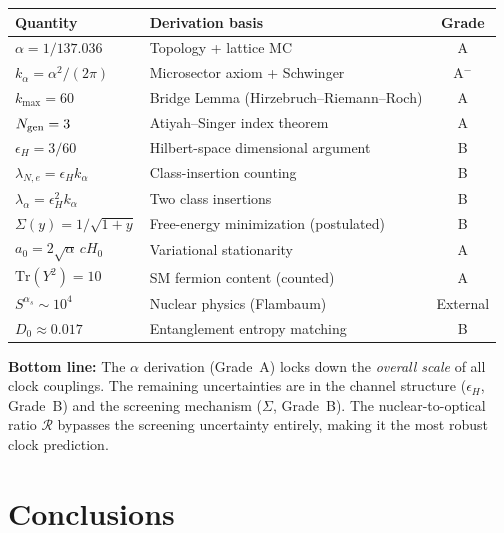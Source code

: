 \documentclass[11pt]{article}
\newcommand{\kalpha}{k_\alpha}
\theoremstyle{definition}
\theoremstyle{remark}
\begin{document}
\begin{center}
\renewcommand{\arraystretch}{1.3}
\begin{tabular}{llc}
\toprule
Quantity & Derivation basis & Grade \\
\midrule
$\alpha = 1/137.036$ & Topology + lattice MC & A \\
$\kalpha = \alpha^2/(2\pi)$ & Microsector axiom + Schwinger & A$^-$ \\
$k_{\max} = 60$ & Bridge Lemma (Hirzebruch--Riemann--Roch) & A \\
$N_{\rm gen} = 3$ & Atiyah--Singer index theorem & A \\
$\epsilon_H = 3/60$ & Hilbert-space dimensional argument & B \\
$\lambda_{N,e} = \epsilon_H \kalpha$ & Class-insertion counting & B \\
$\lambda_\alpha = \epsilon_H^2 \kalpha$ & Two class insertions & B \\
$\Sigma(y) = 1/\sqrt{1+y}$ & Free-energy minimization (postulated) & B \\
$a_0 = 2\sqrt{\alpha}\,cH_0$ & Variational stationarity & A \\
$\mathrm{Tr}(Y^2) = 10$ & SM fermion content (counted) & A \\
$S^{\alpha_s} \sim 10^4$ & Nuclear physics (Flambaum) & External \\
$D_0 \approx 0.017$ & Entanglement entropy matching & B \\
\bottomrule
\end{tabular}
\end{center}

\textbf{Bottom line:} The $\alpha$ derivation (Grade~A) locks down the
\emph{overall scale} of all clock couplings. The remaining uncertainties
are in the channel structure ($\epsilon_H$, Grade~B) and the screening
mechanism ($\Sigma$, Grade~B). The nuclear-to-optical ratio $\mathcal{R}$
bypasses the screening uncertainty entirely, making it the most robust
clock prediction.

\section{Conclusions}
\end{document}
